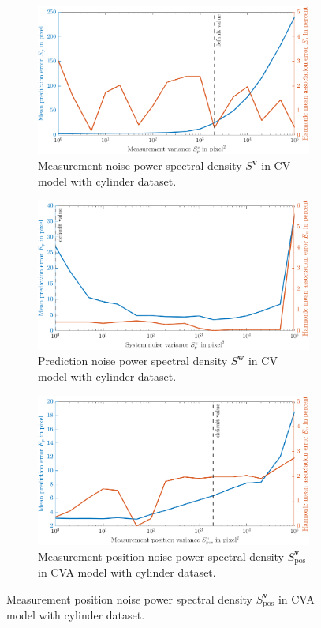 \begin{figure}
    \ContinuedFloat
    \centering
	\begin{subfigure}[t]{0.8\textwidth}
		\includegraphics[width=\textwidth]{figures/KF/appendix/c cv meacov.png}
		\caption{Measurement noise power spectral density     $S^{\boldsymbol{v}}$ in CV model with cylinder dataset.}
	\end{subfigure}
	\begin{subfigure}[t]{0.8\textwidth}
		\includegraphics[width=\textwidth]{figures/KF/appendix/c cv precov.png}
		\caption{Prediction noise power spectral density     $S^{\boldsymbol{w}}$ in CV model with cylinder dataset.}
	\end{subfigure}
	\begin{subfigure}[t]{0.8\textwidth}
		\includegraphics[width=\textwidth]{figures/KF/appendix/c cva meacov.png}
		\caption{Measurement position noise power spectral density     $S_{\mathrm{pos}}^{\boldsymbol{v}}$ in CVA model with cylinder dataset.}
	\end{subfigure}
\end{figure}

